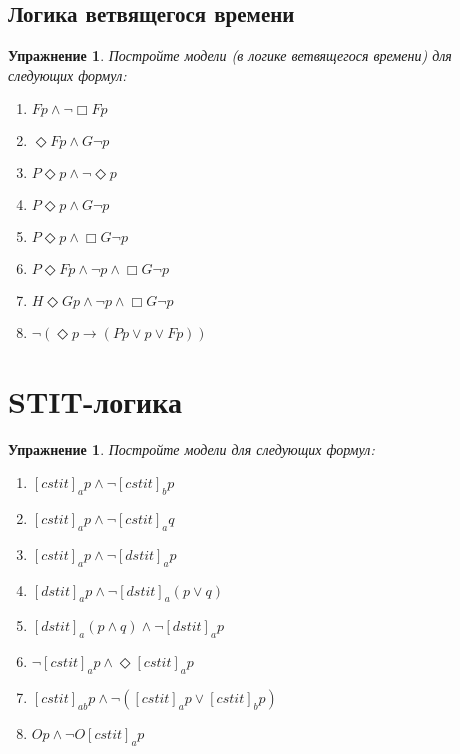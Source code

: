 \documentclass[11pt]{article}
\newtheorem{exercise}[theorem]{Упражнение}
\begin{document}
\subsection{Логика ветвящегося времени}

\begin{exercise} Постройте модели (в логике ветвящегося времени) для следующих формул:
\begin{multicols}{2}
\begin{enumerate}
\item $Fp \wedge \neg \Box Fp$
\item $\Diamond F p \land G \neg p $
\item $ P \Diamond p \land \neg \Diamond p $
\item $ P \Diamond p \land  G \neg p $
\item $ P \Diamond p \land \Box G \neg p $
\item $P \Diamond F p \wedge \neg p \wedge \Box G \neg p $	
\item $H \Diamond G p \wedge \neg p \wedge \Box G \neg p $	
\item $\neg (\Diamond p \to (Pp \vee p \vee Fp))$
\end{enumerate}
\end{multicols}	
\end{exercise}

\section{STIT-логика}
\begin{exercise} Постройте модели для следующих формул:
\begin{enumerate}
	\item $[cstit]_a p \wedge \neg [cstit]_b p$
	\item $[cstit]_a p \wedge \neg [cstit]_a q$
	\item $[cstit]_a p \wedge \neg [dstit]_a p$
	\item $[dstit]_a p \wedge \neg [dstit]_a (p \vee q)$
    \item $[dstit]_a (p \wedge q) \wedge \neg [dstit]_a p$
	\item $\neg [cstit]_a p \wedge \Diamond [cstit]_a p $
    \item $[cstit]_{ab} p \wedge \neg ([cstit]_a p \vee [cstit]_b p) $
    \item $Op \wedge \neg O [cstit]_a p $
\end{enumerate}
\end{exercise}
\end{document}
